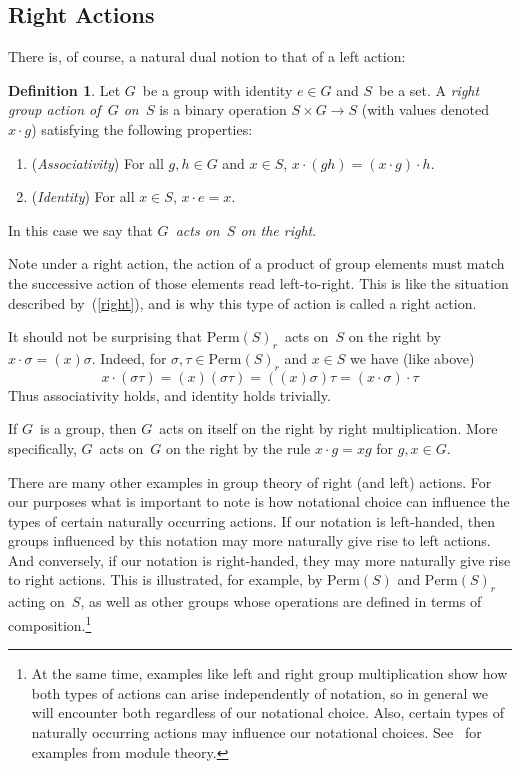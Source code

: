 \documentclass[letterpaper]{article}
\theoremstyle{definition}
\newtheorem*{defn}{Definition}
\theoremstyle{plain}
\newcommand{\perm}[1]{\mathrm{Perm}({#1})}
\begin{document}
\subsection*{Right Actions}
There is, of course, a natural dual notion to that of a left action:
\goodbreak
\begin{defn}
Let $G$~be a group with identity $e\in G$ and $S$~be a set. A \emph{right group action of~$G$ on~$S$} is a binary operation $S\times G\to S$ (with values denoted~$x\cdot g$) satisfying the following properties:
\begin{enumerate}[itemsep=0pt]
\item (\emph{Associativity}) For all $g,h\in G$ and $x\in S$, $x\cdot(gh)=(x\cdot g)\cdot h$.
\item (\emph{Identity}) For all $x\in S$, $x\cdot e=x$.
\end{enumerate}
In this case we say that \emph{$G$~acts on~$S$ on the right}.
\end{defn}
\noindent Note under a right action, the action of a product of group elements must match the successive action of those elements read left-to-right. This is like the situation described by~(\ref{right}), and is why this type of action is called a right action.

It should not be surprising that $\perm{S}_r$~acts on~$S$ on the right by $x\cdot\sigma=(x)\sigma$. Indeed, for $\sigma,\tau\in\perm{S}_r$ and $x\in S$ we have (like above)
$$x\cdot(\sigma\tau)=(x)(\sigma\tau)=((x)\sigma)\tau=(x\cdot\sigma)\cdot\tau$$
Thus associativity holds, and identity holds trivially.

If $G$~is a group, then $G$~acts on itself on the right by right multiplication. More specifically, $G$~acts on~$G$ on the right by the rule $x\cdot g=xg$ for $g,x\in G$.

There are many other examples in group theory of right (and left) actions. For our purposes what is important to note is how notational choice can influence the types of certain naturally occurring actions. If our notation is left-handed, then groups influenced by this notation may more naturally give rise to left actions. And conversely, if our notation is right-handed, they may more naturally give rise to right actions. This is illustrated, for example, by $\perm{S}$ and $\perm{S}_r$ acting on~$S$, as well as other groups whose operations are defined in terms of composition.\footnote{At the same time, examples like left and right group multiplication show how both types of actions can arise independently of notation, so in general we will encounter both regardless of our notational choice. Also, certain types of naturally occurring actions may influence our notational choices. See~\cite{bergman97} for examples from module theory.}
\end{document}
